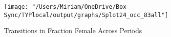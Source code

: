 \documentclass[12pt]{article}
\begin{document}
\begin{figure}[H]
\centering
\caption{Transitions in Fraction Female Across Periods}
\label{transitions83}
\texttt{[image: "/Users/Miriam/OneDrive/Box Sync/TYPlocal/output/graphs/Splot24\_occ\_83all"]}
\end{figure}

%
%
%
%
%
%
%
\end{document}
